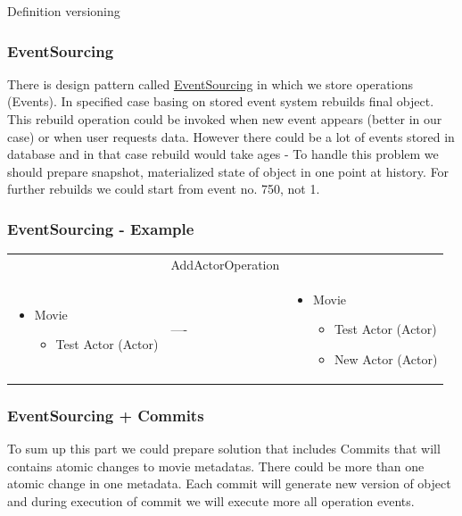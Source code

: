 \documentclass{beamer}
\begin{document}
\begin{section}{Definition versioning}
\begin{frame}
\frametitle {EventSourcing}
There is design pattern called \href{https://martinfowler.com/eaaDev/EventSourcing.html}{EventSourcing} in which we store operations (Events). In specified case basing on stored event system rebuilds final object. \pause \newline
This rebuild operation could be invoked when new event appears (better in our case) or when user requests data. \newline \pause
However there could be a lot of events stored in database and in that case rebuild would take ages \pause - To handle this problem we should prepare snapshot, materialized state of object in one point at history. For further rebuilds we could start from event no. 750, not 1. 
\end{frame}

\begin{frame}
\frametitle {EventSourcing - Example}

\begin{center}

\begin{tabular}{ m{3.5cm}   m{2cm}  m{3.5cm}   } 
 & AddActorOperation &  \\
\begin{itemize}
	\item Movie
		\begin{itemize}
			\item Test Actor (Actor)
		\end{itemize}
\end{itemize} & ----\ & 

\begin{itemize}
	\item Movie
		\begin{itemize}
			\item Test Actor (Actor)
			\item New Actor (Actor)
		\end{itemize}
\end{itemize} 
 
\end{tabular}

\end{center}

\end{frame}

\begin{frame}
\frametitle{EventSourcing + Commits}
To sum up this part we could prepare solution that includes Commits that will contains atomic changes to movie metadatas. There could be more than one atomic change in one metadata. 
Each commit will generate new version of object and during execution of commit we will execute more all operation events.
\end{frame}

\end{section}
\end{document}
